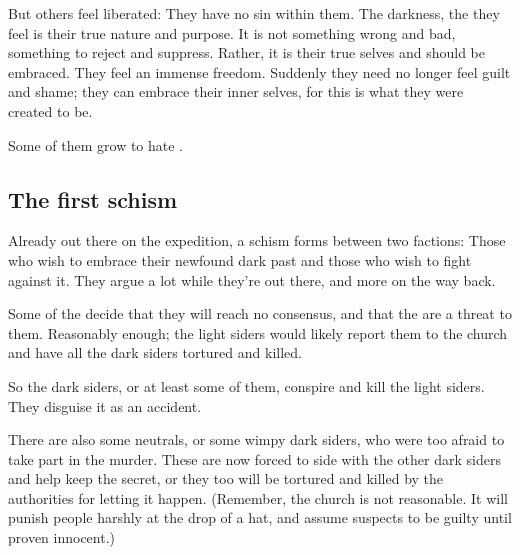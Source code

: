 But others feel liberated: 
They have no sin within them. 
The darkness, the  they feel is their true nature and purpose. 
It is not something wrong and bad, something to reject and suppress. 
Rather, it is their true selves and should be embraced. 
They feel an immense freedom. 
Suddenly they need no longer feel guilt and shame; they can embrace their inner selves, for this is what they were created to be. 

Some of them grow to hate \Merkyrah. 










\subsection{The first schism}
Already out there on the expedition, a schism forms between two factions: 
Those who wish to embrace their newfound dark past and those who wish to fight against it. 
They argue a lot while they're out there, and more on the way back. 

Some of the  decide that they will reach no consensus, and that the  are a threat to them. 
Reasonably enough; the light siders would likely report them to the church and have all the dark siders tortured and killed. 

So the dark siders, or at least some of them, conspire and kill the light siders. 
They disguise it as an accident. 

There are also some neutrals, or some wimpy dark siders, who were too afraid to take part in the murder. 
These are now forced to side with the other dark siders and help keep the secret, or they too will be tortured and killed by the authorities for letting it happen. 
(Remember, the \resphan{} church is not reasonable. 
It will punish people harshly at the drop of a hat, and assume suspects to be guilty until proven innocent.)

